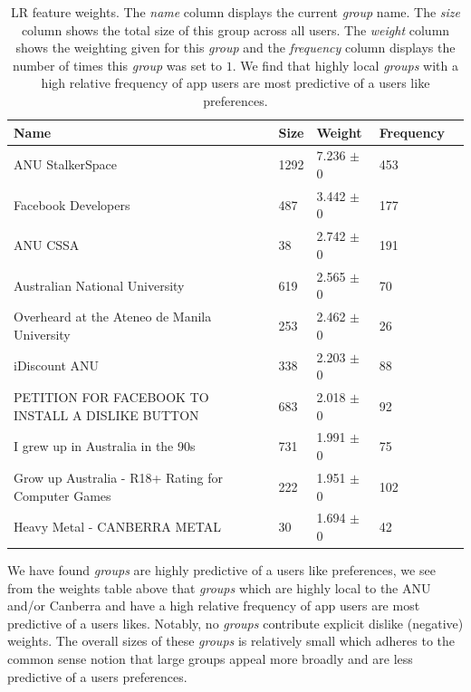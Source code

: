 \begin{table}[h]
\begin{minipage}[b]{1.0\textwidth}
\centering
  \begin{tabular}{|l|l|l|l|l|} %
  \hline
  \textbf{Name} & \textbf{Size} & \textbf{Weight} & \textbf{Frequency} \\ \hline
\small{ANU StalkerSpace} & 1292 & 7.236 $\pm$ 0 & 453 \\ \hline
\small{Facebook Developers} & 487 & 3.442 $\pm$ 0 & 177 \\ \hline
\small{ANU CSSA} & 38 & 2.742 $\pm$ 0 & 191 \\ \hline
\small{Australian National University} & 619 & 2.565 $\pm$ 0 & 70 \\ \hline
\small{Overheard at the Ateneo de Manila University} & 253 & 2.462 $\pm$ 0 & 26 \\ \hline
\small{iDiscount ANU} & 338 & 2.203 $\pm$ 0 & 88 \\ \hline
\small{PETITION FOR FACEBOOK TO INSTALL A DISLIKE BUTTON} & 683 & 2.018 $\pm$ 0 & 92 \\ \hline
\small{I grew up in Australia in the 90s} & 731 & 1.991 $\pm$ 0 & 75 \\ \hline
\small{Grow up Australia - R18+ Rating for Computer Games} & 222 & 1.951 $\pm$ 0 & 102 \\ \hline
\small{Heavy Metal - CANBERRA METAL} & 30 & 1.694 $\pm$ 0 & 42 \\ \hline
  \end{tabular}
  \caption{LR feature weights. The \emph{name} column displays the current \emph{group} name.
  The \emph{size} column shows the total size of this group across all users.
  The \emph{weight} column shows the weighting given for this \emph{group} and the \emph{frequency} column displays the number of times 
  this \emph{group} was set to $1$. We find that highly local \emph{groups} with a high relative frequency of app users are most predictive of a users like preferences.}
\end{minipage}
\end{table}

We have found \emph{groups} are highly predictive of a users like preferences, we see from the weights table above that \emph{groups} which are highly local to 
the ANU and/or Canberra and have a high relative frequency of app users are most predictive of a users likes. Notably, no \emph{groups} contribute 
explicit dislike (negative) weights. The 
overall sizes of these \emph{groups} is relatively small which adheres to the common sense notion that large groups appeal more 
broadly and are less predictive of a users preferences.


